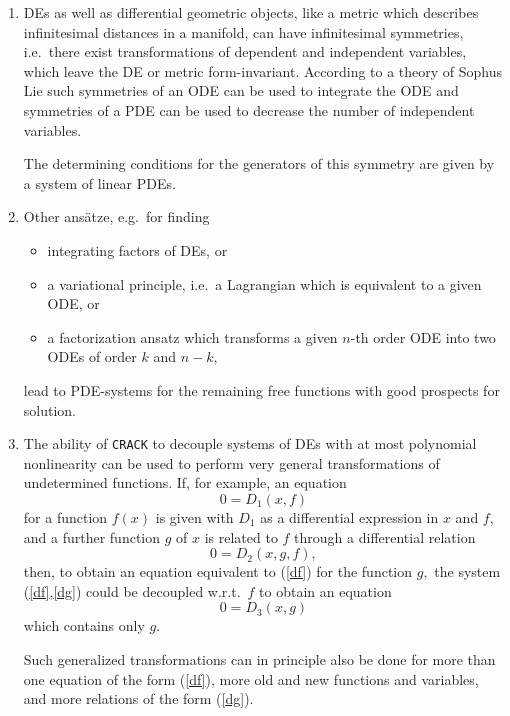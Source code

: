 \begin{enumerate}
 \item
  DEs as well as differential geometric objects, like a metric which
  describes infinitesimal distances in a manifold, can have
  infinitesimal symmetries, i.e.\ there exist transformations of dependent
  and independent variables, which leave the DE or metric 
  form-invariant. According to a theory of Sophus Lie such
  symmetries of an ODE can be used to integrate the
  ODE and symmetries of a PDE can be used to decrease the number
  of independent variables.
 
    The determining conditions for the generators of this
  symmetry are given by a system of linear PDEs.

\item
  Other ans\"atze, e.g.\ for finding 
\begin{itemize} 
\item integrating factors of DEs, or
\item a variational principle, i.e.\ a Lagrangian which is equivalent
    to a given ODE, or
\item a factorization ansatz which transforms a given $n$-th order 
    ODE into two ODEs of order $k$ and $n-k,$
\end{itemize}
  lead to PDE-systems for the remaining free functions with good
  prospects for solution.
\item
  The ability of {\tt CRACK} to decouple systems of DEs with at most polynomial
  nonlinearity can be used to perform very general transformations of
  undetermined functions. If, for example, an equation
\begin{equation}
        0 = D_1(x, f)             \label{df}                                   
\end{equation}
  for a function $f(x)$ is given with $D_1$ as a differential
expression in $x$ and $f$, and a further function $g$ of $x$ 
is related to $f$ through a differential relation
\begin{equation}
        0 = D_2(x, g, f),          \label{dg}
\end{equation}
then, to obtain an equation equivalent to (\ref{df}) for the function $g,$
the system (\ref{df},\ref{dg}) could be decoupled w.r.t.\ $f$ to
obtain an equation 
\[        0 = D_3(x, g)     \]
which contains only $g$. 

    Such generalized transformations can in principle also be done for more
than one equation of the form (\ref{df}), more old and new functions and 
variables, and more relations of the form (\ref{dg}).


\end{enumerate}
